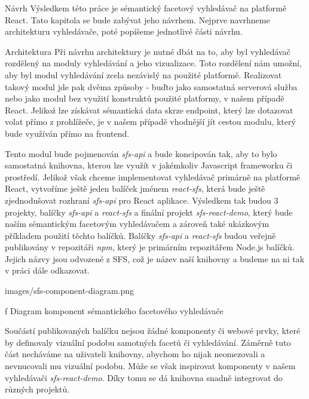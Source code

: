 \chap[navrh] Návrh
Výsledkem této práce je sémantický facetový vyhledávač na platformě React.
Tato kapitola se bude zabývat jeho návrhem.
Nejprve navrhneme architekturu vyhledávače, poté popíšeme jednotlivé části návrhu.


\sec Architektura
Při návrhu architektury je nutné dbát na to, aby byl vyhledávač rozdělený na moduly vyhledávání a jeho vizualizace.
Toto rozdělení nám umožní, aby byl modul vyhledávání zcela nezávislý na použité platformě.
Realizovat takový modul jde pak dvěma způsoby - buďto jako samostatná serverová služba nebo jako modul bez využití konstruktů použité platformy, v našem případě React.
Jelikož lze získávat sémantická data skrze  endpoint, který lze dotazovat volat přímo z prohlížeče, je v našem případě vhodnější jít cestou modulu, který bude využíván přímo na frontend.

Tento modul bude pojmenován {\em sfs-api} a bude koncipován tak, aby to bylo samostatná knihovna, kterou lze využít v jakémkoliv Javascript frameworku či prostředí.
Jelikož však chceme implementovat vyhledávač primárně na platformě React, vytvoříme ještě jeden balíček jménem {\em react-sfs}, která bude ještě zjednodušovat rozhraní {\em sfs-api} pro React aplikace.
Výsledkem tak budou 3 projekty, balíčky {\em sfs-api} a {\em react-sfs} a finální projekt {\em sfs-react-demo}, který bude naším sémantickým facetovým vyhledávačem a zároveň také ukázkovým příkladem použití těchto balíčků.
Balíčky {\em sfs-api} a {\em react-sfs} budou veřejně publikovány v repozitáři {\em npm}, který je primárním repozitářem Node.js balíčků.
Jejich názvy jsou odvozené z SFS, což je název naší knihovny a budeme na ni tak v práci dále odkazovat.

\midinsert
\picw=15cm \cinspic images/sfs-component-diagram.png
\caption/f Diagram komponent sémantického facetového vyhledávače
\endinsert

Součástí publikovaných balíčku nejsou žádné komponenty či webové prvky, které by definovaly vizuální podobu samotných facetů či vyhledávání. 
Záměrně tuto část necháváme na uživateli knihovny, abychom ho nijak neomezovali a nevnucovali mu vizuální podobu.
Může se však inspirovat komponenty v našem vyhledávači {\em sfs-react-demo}.
Díky tomu se dá knihovna snadně integrovat do různých projektů.

